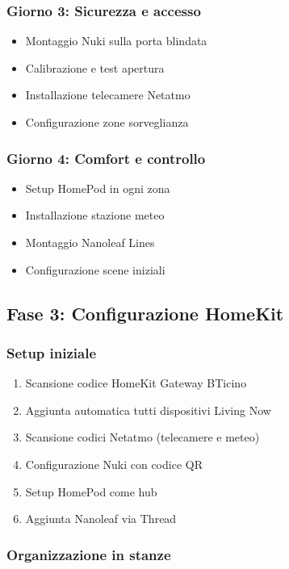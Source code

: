 \subsubsection{Giorno 3: Sicurezza e accesso}

\begin{itemize}
    \item Montaggio Nuki sulla porta blindata
    \item Calibrazione e test apertura
    \item Installazione telecamere Netatmo
    \item Configurazione zone sorveglianza
\end{itemize}

\subsubsection{Giorno 4: Comfort e controllo}

\begin{itemize}
    \item Setup HomePod in ogni zona
    \item Installazione stazione meteo
    \item Montaggio Nanoleaf Lines
    \item Configurazione scene iniziali
\end{itemize}

\subsection{Fase 3: Configurazione HomeKit}

\subsubsection{Setup iniziale}

\begin{enumerate}
    \item Scansione codice HomeKit Gateway BTicino
    \item Aggiunta automatica tutti dispositivi Living Now
    \item Scansione codici Netatmo (telecamere e meteo)
    \item Configurazione Nuki con codice QR
    \item Setup HomePod come hub
    \item Aggiunta Nanoleaf via Thread
\end{enumerate}

\subsubsection{Organizzazione in stanze}

